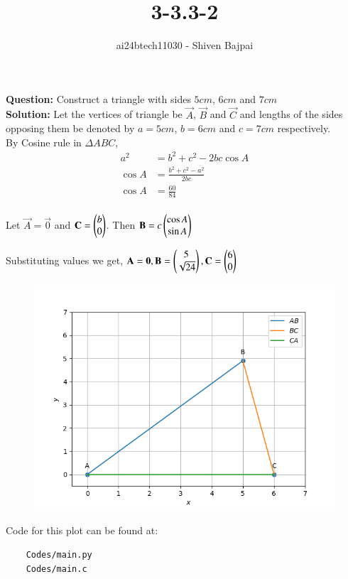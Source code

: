 \documentclass[journal]{IEEEtran}
\begin{document}
\onecolumn

\vspace{3cm}

\renewcommand{\thefigure}{\theenumi}
\renewcommand{\thetable}{\theenumi}

\title{3-3.3-2}
\author{ai24btech11030 - Shiven Bajpai}
\maketitle

\renewcommand{\thefigure}{\theenumi}
\renewcommand{\thetable}{\theenumi}

\textbf{Question: } Construct a triangle with sides $5cm$, $6cm$ and $7cm$
\\

\textbf{Solution: } Let the vertices of triangle be $\vec{A}$, $\vec{B}$ and $\vec{C}$ and lengths of the sides opposing them be denoted by $a = 5cm$, $b = 6cm$ and $c = 7cm$ respectively.
\\

By Cosine rule in $\Delta ABC$,
\begin{align*}
	a^2 &= b^2 + c^2 - 2bc \cos A\\
	\cos A &= \frac{b^2 + c^2 - a^2}{2bc}\\
	\cos A &= \frac{60}{84}\\
\end{align*}

Let $\vec{A} = \vec{0}$ and $\mathbf{C} = \begin{pmatrix}b \\ 0\end{pmatrix}$. Then $\mathbf{B} = c\begin{pmatrix}\cos A \\ \sin A\end{pmatrix}$

Substituting values we get, $\mathbf{A} = \mathbf{0}, \mathbf{B} = \begin{pmatrix}5 \\ \sqrt{24}\end{pmatrix}, \mathbf{C} = \begin{pmatrix}6 \\ 0\end{pmatrix}$

\begin{figure}[H]
	\centering
	\includegraphics[width=0.75\columnwidth]{Figures/Figure.png}
	\label{fig}
\end{figure}

Code for this plot can be found at:
\begin{lstlisting}
    Codes/main.py
    Codes/main.c
\end{lstlisting}
\end{document}
